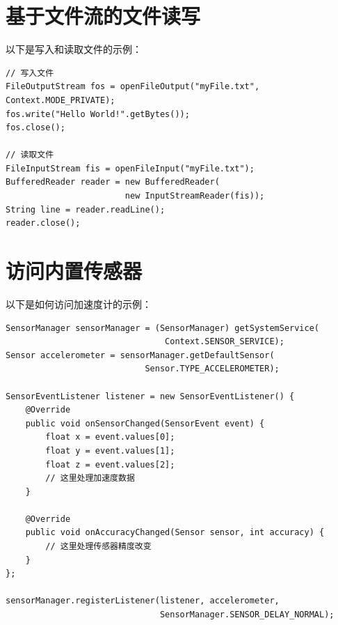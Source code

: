 \documentclass[12pt, a4paper, oneside]{ctexbook}
\numberwithin{figure}{section}
\begin{document}
\section{基于文件流的文件读写}

以下是写入和读取文件的示例：

\begin{verbatim}
// 写入文件
FileOutputStream fos = openFileOutput("myFile.txt", Context.MODE_PRIVATE);
fos.write("Hello World!".getBytes());
fos.close();

// 读取文件
FileInputStream fis = openFileInput("myFile.txt");
BufferedReader reader = new BufferedReader(
                        new InputStreamReader(fis));
String line = reader.readLine();
reader.close();

\end{verbatim}

\section{访问内置传感器}
以下是如何访问加速度计的示例：
\begin{verbatim}
SensorManager sensorManager = (SensorManager) getSystemService(
                                Context.SENSOR_SERVICE);
Sensor accelerometer = sensorManager.getDefaultSensor(
                            Sensor.TYPE_ACCELEROMETER);

SensorEventListener listener = new SensorEventListener() {
    @Override
    public void onSensorChanged(SensorEvent event) {
        float x = event.values[0];
        float y = event.values[1];
        float z = event.values[2];
        // 这里处理加速度数据
    }

    @Override
    public void onAccuracyChanged(Sensor sensor, int accuracy) {
        // 这里处理传感器精度改变
    }
};

sensorManager.registerListener(listener, accelerometer, 
                               SensorManager.SENSOR_DELAY_NORMAL);

\end{verbatim}
\end{document}
